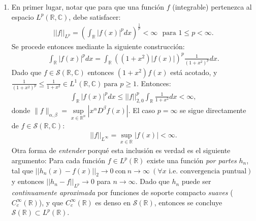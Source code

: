\documentclass[spanish, fleqn]{article}
\begin{document}
\begin{description}
\begin{enumerate}
        \item En primer lugar, notar que para que una función $f$ (integrable) pertenezca al espacio $L^p(\mathbb{R}, \mathbb{C})$, debe satisfacer:
        \begin{align*}
             ||f||_{L^p} = \left( \int_{\mathbb{R}} |f(x)|^p dx \right)^{\frac{1}{p}} < \infty  \ \ \ \text{para } 1 \leq p < \infty.
        \end{align*}
        Se procede entonces mediante la siguiente construcción:
        \begin{align*}
            \int_{\mathbb{R}} \left|f(x)\right|^p dx = \int_{\mathbb{R}} \left((1+x^2)|f(x)|\right)^p\frac{1}{(1+x^2)^p} dx.
        \end{align*}
        Dado que $f  \in \mathcal{S}(\mathbb{R},\mathbb{C})$ entonces  $(1+x^2)f(x)$ está acotado, y $\displaystyle \frac{1}{(1+x^2)^p} \leq \frac{1}{1+x^2} \in L^1(\mathbb{R}, \mathbb{C}) \ \text{para } p\geq 1 $. Entonces:
        \begin{align*}
            \int_{\mathbb{R}} |f(x)|^p dx \leq ||f||_{2,0}^p \int_{\mathbb{R}} \frac{1}{1+x^2} dx < \infty,
        \end{align*}
        donde $\displaystyle \|f\|_{\alpha,\beta} = \underset{x\in\mathbb{R}^n}{\sup} |x^\alpha D^\beta f(x)|$. El caso $p = \infty$ se sigue directamente de  $f \in \mathcal{S}(\mathbb{R},\mathbb{C})$:
        \begin{align*}
             ||f||_{L^\infty} = \sup_{x \in \mathbb{R}} \left|f(x)\right| < \infty.
         \end{align*}
         Otra forma de \textit{entender} porqué esta inclusión es verdad es el siguiente argumento: Para cada función $f \in L^p(\mathbb{R})$ existe una función \textit{por partes} $h_n$, tal que $||h_n(x) - f(x)||_{2} \rightarrow 0 \ \text{con} \ n\rightarrow \infty \ (\forall x \text{ i.e. convergencia puntual})$ y entonces $||h_n - f||_{L^p} \rightarrow 0$ para $n \rightarrow \infty$. Dado que $h_n$ puede ser \textit{continuamente aproximada} por funciones de soporte compacto \textit{suaves} ($C_{c}^{\infty}(\mathbb{R})$), y que $C_{c}^{\infty}(\mathbb{R})$ es denso en $\mathcal{S}(\mathbb{R})$, entonces se concluye $\mathcal{S}(\mathbb{R}) \subset L^p(\mathbb{R})$.
    \end{enumerate}





\end{description}
\end{document}
